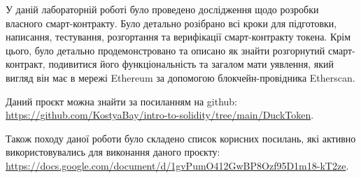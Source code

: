 
У даній лабораторній роботі було проведено дослідження щодо розробки власного смарт-контракту. Було детально розібрано всі кроки для підготовки, написання, тестування, розгортання та верифікації смарт-контракту токена. Крім цього, було детально продемонстровано та описано як знайти розгорнутий смарт-контракт, подивитися його функціональність та загалом мати уявлення, який вигляд він має в мережі Ethereum за допомогою блокчейн-провідника Etherscan.

Даний проєкт можна знайти за посиланням на github: \url{https://github.com/KostyaBay/intro-to-solidity/tree/main/DuckToken}.

Також походу даної роботи було складено список корисних посилань, які активно використовувались для виконання даного проєкту: 
\href{https://docs.google.com/document/d/1gvPumO412GwBP8Ozf95D1m18-kT2zeCEqOkF4aYJ5k8/edit?usp=sharing}{https://docs.google.com/document/d/1gvPumO412GwBP8Ozf95D1m18-kT2ze}.